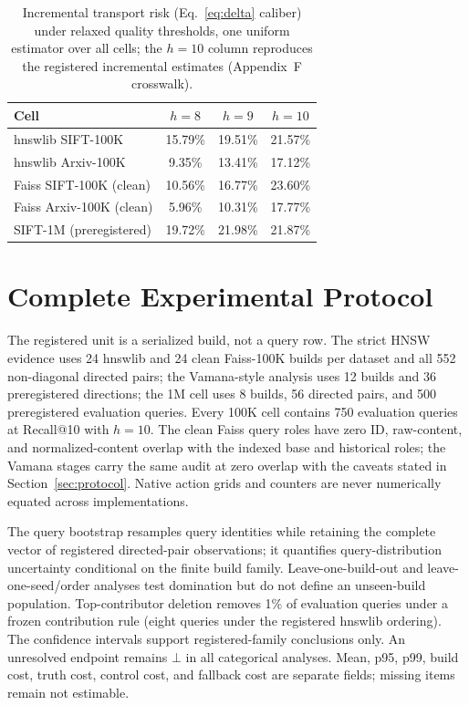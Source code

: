 \documentclass{article}
\newcommand{\BOT}{\bot}
\begin{document}
\begin{table}[t]
\centering
\caption{Incremental transport risk (Eq.~\ref{eq:delta} caliber) under relaxed quality thresholds, one
uniform estimator over all cells; the $h{=}10$ column reproduces the registered incremental estimates
(Appendix~F crosswalk).}
\label{tab:hsens}
\footnotesize
\setlength{\tabcolsep}{4pt}
\begin{tabular}{lccc}
\toprule
Cell & $h{=}8$ & $h{=}9$ & $h{=}10$ \\
\midrule
hnswlib SIFT-100K & 15.79\% & 19.51\% & 21.57\% \\
hnswlib Arxiv-100K & 9.35\% & 13.41\% & 17.12\% \\
Faiss SIFT-100K (clean) & 10.56\% & 16.77\% & 23.60\% \\
Faiss Arxiv-100K (clean) & 5.96\% & 10.31\% & 17.77\% \\
SIFT-1M (preregistered) & 19.72\% & 21.98\% & 21.87\% \\
\bottomrule
\end{tabular}
\end{table}

\section{Complete Experimental Protocol}
\label{app:protocol}

The registered unit is a serialized build, not a query row. The strict HNSW evidence uses 24 hnswlib and 24
clean Faiss-100K builds per dataset and all 552 non-diagonal directed pairs; the Vamana-style analysis uses
12 builds and 36 preregistered directions; the 1M cell uses 8 builds, 56 directed pairs, and 500
preregistered evaluation queries. Every 100K cell contains 750 evaluation queries at Recall@10 with $h=10$.
The clean Faiss query roles have zero ID, raw-content, and normalized-content overlap with the indexed base
and historical roles; the Vamana stages carry the same audit at zero overlap with the caveats stated in
Section~\ref{sec:protocol}. Native action grids and counters are never numerically equated across
implementations.

The query bootstrap resamples query identities while retaining the complete vector of registered
directed-pair observations; it quantifies query-distribution uncertainty conditional on the finite build
family. Leave-one-build-out and leave-one-seed/order analyses test domination but do not define an
unseen-build population. Top-contributor deletion removes 1\% of evaluation queries under a frozen
contribution rule (eight queries under the registered hnswlib ordering). The confidence intervals support
registered-family conclusions only. An unresolved endpoint remains $\BOT$ in all categorical analyses.
Mean, p95, p99, build cost, truth cost, control cost, and fallback cost are separate fields; missing items
remain not estimable.
\end{document}
